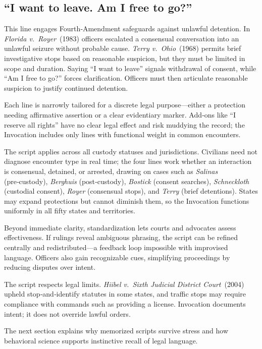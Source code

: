 \subsection*{``I want to leave. Am I free to go?''}
This line engages Fourth‑Amendment safeguards against unlawful detention. In \textit{Florida v.\ Royer} (1983) officers escalated a consensual conversation into an unlawful seizure without probable cause. \textit{Terry v.\ Ohio} (1968) permits brief investigative stops based on reasonable suspicion, but they must be limited in scope and duration. Saying ``I want to leave'' signals withdrawal of consent, while ``Am I free to go?'' forces clarification. Officers must then articulate reasonable suspicion to justify continued detention.

\bigskip
Each line is narrowly tailored for a discrete legal purpose—either a protection needing affirmative assertion or a clear evidentiary marker. Add‑ons like ``I reserve all rights'' have no clear legal effect and risk muddying the record; the Invocation includes only lines with functional weight in common encounters.

The script applies across all custody statuses and jurisdictions. Civilians need not diagnose encounter type in real time; the four lines work whether an interaction is consensual, detained, or arrested, drawing on cases such as \textit{Salinas} (pre‑custody), \textit{Berghuis} (post‑custody), \textit{Bostick} (consent searches), \textit{Schneckloth} (custodial consent), \textit{Royer} (consensual stops), and \textit{Terry} (brief detentions). States may expand protections but cannot diminish them, so the Invocation functions uniformly in all fifty states and territories.

Beyond immediate clarity, standardization lets courts and advocates assess effectiveness. If rulings reveal ambiguous phrasing, the script can be refined centrally and redistributed—a feedback loop impossible with improvised language. Officers also gain recognizable cues, simplifying proceedings by reducing disputes over intent.

The script respects legal limits. \textit{Hiibel v.\ Sixth Judicial District Court} (2004) upheld stop‑and‑identify statutes in some states, and traffic stops may require compliance with commands such as providing a license. Invocation documents intent; it does not override lawful orders.

The next section explains why memorized scripts survive stress and how behavioral science supports instinctive recall of legal language.
